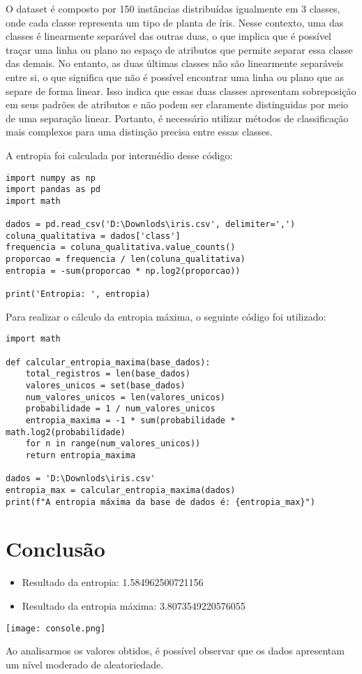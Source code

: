 \documentclass{article}
\begin{document}
\vspace{0,5cm}

O dataset é composto por 150 instâncias distribuídas igualmente em 3 classes, onde cada classe representa um tipo de planta de íris. Nesse contexto, uma das classes é linearmente separável das outras duas, o que implica que é possível traçar uma linha ou plano no espaço de atributos que permite separar essa classe das demais. No entanto, as duas últimas classes não são linearmente separáveis entre si, o que significa que não é possível encontrar uma linha ou plano que as separe de forma linear. Isso indica que essas duas classes apresentam sobreposição em seus padrões de atributos e não podem ser claramente distinguidas por meio de uma separação linear. Portanto, é necessário utilizar métodos de classificação mais complexos para uma distinção precisa entre essas classes.

\vspace{0,5cm}

A entropia foi calculada por intermédio desse código:

\begin{verbatim}
import numpy as np
import pandas as pd
import math

dados = pd.read_csv('D:\Downlods\iris.csv', delimiter=',')
coluna_qualitativa = dados['class']
frequencia = coluna_qualitativa.value_counts()
proporcao = frequencia / len(coluna_qualitativa)
entropia = -sum(proporcao * np.log2(proporcao))

print('Entropia: ', entropia)
\end{verbatim}

Para realizar o cálculo da entropia máxima, o seguinte código foi utilizado:

\begin{verbatim}
import math

def calcular_entropia_maxima(base_dados):
    total_registros = len(base_dados)
    valores_unicos = set(base_dados)
    num_valores_unicos = len(valores_unicos)
    probabilidade = 1 / num_valores_unicos
    entropia_maxima = -1 * sum(probabilidade * math.log2(probabilidade) 
    for n in range(num_valores_unicos))
    return entropia_maxima

dados = 'D:\Downlods\iris.csv'
entropia_max = calcular_entropia_maxima(dados)
print(f"A entropia máxima da base de dados é: {entropia_max}")
\end{verbatim}

\section*{Conclusão}
\begin{itemize}
    \item Resultado da entropia: 1.584962500721156
    \item Resultado da entropia máxima: 3.8073549220576055
\end{itemize}

\texttt{[image: console.png]}

\vspace{0,5cm}

Ao analisarmos os valores obtidos, é possível observar que os dados apresentam um nível moderado de aleatoriedade.
\end{document}
